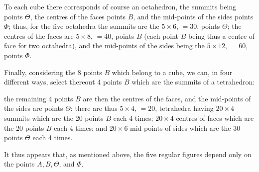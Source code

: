 \documentclass[11pt,a4paper]{article}
\begin{document}
\medskip

To each cube there corresponds of course an octahedron, the summits being points $\Theta$, the centres of the faces points $B$, and the mid-points of the sides points $\Phi$; thus, for the five octahedra the summits are the $5 \times 6$, $= 30$, points $\Theta$; the centres of the faces are $5 \times 8$, $= 40$, points $B$ (each point $B$ being thus a centre of face for two octahedra), and the mid-points of the sides being the $5 \times 12$, $= 60$, points $\Phi$.

\medskip

Finally, considering the 8 points $B$ which belong to a cube, we can, in four different ways, select thereout 4 points $B$ which are the summits of a tetrahedron:

\newpage


\noindent the remaining 4 points $B$ are then the centres of the faces, and the mid-points of the sides are points $\Theta$: there are thus $5 \times 4$, $= 20$, tetrahedra having $20 \times 4$ summits which are the 20 points $B$ each 4 times; $20 \times 4$ centres of faces which are the 20 points $B$ each 4 times; and $20 \times 6$ mid-points of sides which are the 30 points $\Theta$ each 4 times.

\medskip

It thus appears that, as mentioned above, the five regular figures depend only on the points $A, B, \Theta$, and $\Phi$.

\medskip
\end{document}
